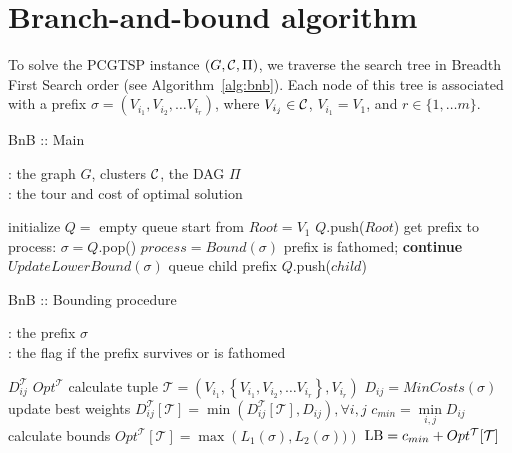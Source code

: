\section{Branch-and-bound algorithm}\label{sec:SA}

To solve the PCGTSP instance
$(G,\mathcal{C},\Pi)$,
we traverse the search tree in
Breadth First Search order
(see Algorithm~\ref{alg:bnb}).
Each node of this tree is associated with
a prefix
$\sigma = \left(V_{i_1}, V_{i_2}, \dots V_{i_r} \right)$,
where
$V_{i_j} \in \mathcal{C}$,
$V_{i_1} = V_1$,
and
$r \in \{{1, \dots m}\}$.

\begin{algorithm}[h!]
\caption{BnB :: Main}\label{alg:bnb}
\hspace*{\algorithmicindent}{\bf Input}: the graph $G$, clusters $\mathcal{C}$, the DAG $\Pi$ \\
\hspace*{\algorithmicindent}{\bf Output}: the tour and cost of optimal solution
\begin{algorithmic}[1]
    \STATE initialize $Q =$ empty queue
    \STATE start from $Root = V_1$
    \STATE $Q$.push($Root$)
        \STATE get prefix to process: $\sigma = Q$.pop()
        \STATE $process = Bound(\sigma)$
            \STATE prefix is fathomed; {\bf continue}
        \ENDIF
        \STATE $UpdateLowerBound(\sigma)$
            \STATE queue child prefix $Q$.push($child$)
        \ENDFOR
    \ENDWHILE
\end{algorithmic}
\end{algorithm}

\begin{algorithm}[h!]
\caption{BnB :: Bounding procedure}\label{alg:bnb:bound}
\hspace*{\algorithmicindent}{\bf Input}: the prefix $\sigma$ \\
\hspace*{\algorithmicindent}{\bf Output}: the flag if the prefix survives or is fathomed
\begin{algorithmic}[1]
     $D_{ij}^{\mathcal T}$
     $Opt^{\mathcal T}$
    \STATE calculate tuple $\mathcal T = \left(V_{i_1},
        \left\{V_{i_1}, V_{i_2}, \dots V_{i_r}\right\}, V_{i_r} \right)$
        \label{alg:bnb:bound:key}
    \STATE $D_{ij} = MinCosts(\sigma)$
        \label{alg:bnb:bound:pfx}
        \RETURN \FALSE
    \ENDIF
    \STATE  update best weights $D_{ij}^{\mathcal T}[\mathcal T]  = \min \left(
        D_{ij}^{\mathcal T}[\mathcal T], D_{ij} \right),
        \forall i, j$
    \STATE  $c_{min} = \min\limits_{i, j} D_{ij}$
        \STATE calculate bounds $Opt^{\mathcal T}[\mathcal T] = \max\left(L_1(\sigma), L_2(\sigma))\right)$
        \label{alg:bnb:bound:sfx}
    \ENDIF
    \STATE $\mathrm{LB} = c_{min} + Opt^{\mathcal T}[\mathcal T]$
        \label{alg:bnb:bound:lb}
    \IF{$\LB > \UB$}
        \RETURN \FALSE
    \ENDIF
    \RETURN \TRUE
\end{algorithmic}
\end{algorithm}

